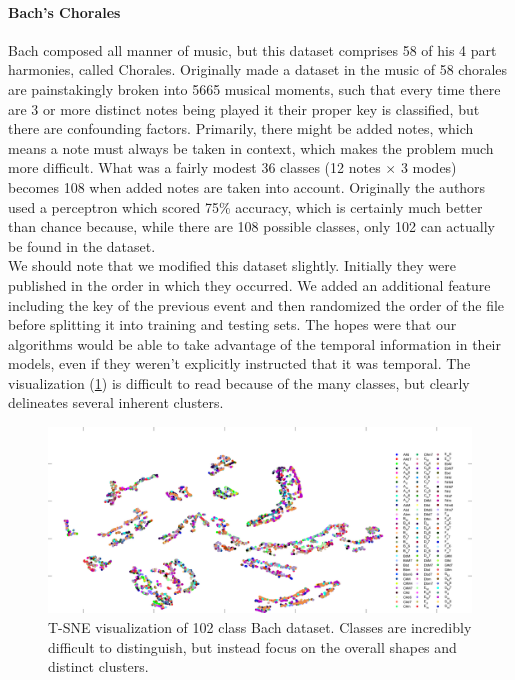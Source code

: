 \paragraph{Bach's Chorales}
Bach composed all manner of music, but this dataset comprises 58 of his 4 part harmonies, called Chorales.  Originally made a dataset in \cite{radicioni_breve:_2010} the music of 58 chorales are painstakingly broken into 5665 musical moments, such that every time there are 3 or more distinct notes being played it their proper key is classified, but there are confounding factors. Primarily, there might be added notes, which means a note must always be taken in context, which makes the problem much more difficult.  What was a fairly modest 36 classes (12 notes $\times$ 3 modes) becomes 108 when added notes are taken into account.  Originally the authors used a perceptron which scored 75\% accuracy, which is certainly much better than chance because, while there are 108 possible classes, only 102 can actually be found in the dataset.  \\We should note that we modified this dataset slightly.  Initially they were published in the order in which they occurred.  We added an additional feature including the key of the previous event and then randomized the order of the file before splitting it into training and testing sets.  The hopes were that our algorithms would be able to take advantage of the temporal information in their models, even if they weren't explicitly instructed that it was temporal.  The visualization (\ref{fig:bachtsne}) is difficult to read because of the many classes, but clearly delineates several inherent clusters.
\begin{figure}
	\centering
	\includegraphics[width=0.9\linewidth]{figures/png/BachTSNE}
	\caption[T-SNE visualization of Bach dataset]{T-SNE visualization of 102 class Bach dataset.  Classes are incredibly difficult to distinguish, but instead focus on the overall shapes and distinct clusters.}
	\label{fig:bachtsne}
\end{figure}
